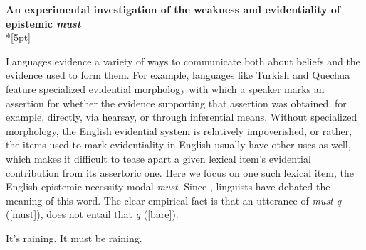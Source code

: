 \documentclass[11pt]{article}
\newcommand{\red}[1]{\textcolor{Red}{#1}}
\begin{document}
\begin{center}\textbf{An experimental investigation of the weakness and evidentiality of epistemic \emph{must}}\\*[5pt]
\end{center}

\vspace{-11pt}


Languages evidence a variety of ways to communicate both about beliefs and the evidence used to form them. For example, languages like Turkish %
and Quechua %
feature specialized evidential morphology with which a speaker marks an assertion for whether the evidence supporting that assertion was obtained, for example, directly, via hearsay, or through inferential means. Without specialized morphology, the English evidential system is relatively impoverished, or rather, the items used to mark evidentiality in English usually have other uses as well, which makes it difficult to tease apart a given lexical item's evidential contribution from its assertoric one. Here we focus on one such lexical item, the English epistemic necessity modal \emph{must}. Since \citep{karttunen1972}, linguists have debated the meaning of this word. The clear empirical fact is that an utterance of \emph{must q} (\ref{must}), does not entail that \emph{q} (\ref{bare}). 


\vspace{-8pt}
\begin{exe}
\ex\label{inference} 
\begin{xlist}
\ex\label{bare}  It's raining.
\ex\label{must} It must be raining.
\end{xlist}
\end{exe}
\vspace{-8pt}
\end{document}
